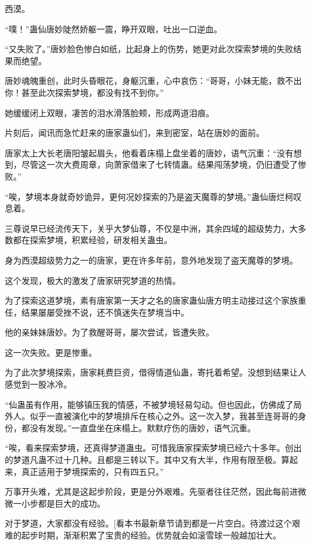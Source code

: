 
\begin{this_body}

西漠。

“噗！”蛊仙唐妙陡然娇躯一震，睁开双眼，吐出一口逆血。

“又失败了。”唐妙脸色惨白如纸，比起身上的伤势，她更对此次探索梦境的失败结果而绝望。

唐妙魂魄重创，此时头昏眼花，身躯沉重，心中哀伤：“哥哥，小妹无能，救不出你！甚至此次探索梦境，都没有找不到你。”

她缓缓闭上双眼，凄苦的泪水滑落脸颊，形成两道泪痕。

片刻后，闻讯而急忙赶来的唐家蛊仙们，来到密室，站在唐妙的面前。

唐家太上大长老唐阳皱起眉头，他看着床榻上盘坐着的唐妙，语气沉重：“没有想到，尽管这一次大费周章，向萧家借来了七转情蛊。结果闯荡梦境，仍旧遭受了惨败。”

“唉，梦境本身就奇妙诡异，更何况妙探索的乃是盗天魔尊的梦境。”蛊仙唐烂柯叹息着。

三尊说早已经流传天下，关乎大梦仙尊，不仅是中洲，其余四域的超级势力，大多数都在探索梦境，积累经验，研发相关蛊虫。

身为西漠超级势力之一的唐家，更在许多年前，意外地发现了盗天魔尊的梦境。

这个发现，极大的激发了唐家研究梦道的热情。

为了探索这道梦境，素有唐家第一天才之名的唐家蛊仙唐方明主动接过这个家族重任，结果屡屡受挫不说，还不慎迷失在梦境当中。

他的亲妹妹唐妙。为了救醒哥哥，屡次尝试，皆遭失败。

这一次失败。更是惨重。

为了此次梦境探索，唐家耗费巨资，借得情道仙蛊，寄托着希望。没想到结果让人感觉到一股冰冷。

“仙蛊虽有作用，能够镇压我的情感，不被梦境轻易勾动。但也因此，仿佛成了局外人。似乎一直被演化中的梦境排斥在核心之外。这一次入梦，我甚至连哥哥的身份，都没有发现。”一直盘坐在床榻上。默默疗伤的唐妙，语气沉重。

“唉，看来探索梦境，还真得梦道蛊虫。可惜我唐家探索梦境已经六十多年。创出的梦道凡蛊不过十几种。且都是三转以下。其中又有大半，作用有限至极。算起来，真正适用于梦境探索的，只有四五只。”

万事开头难，尤其是这起步阶段，更是分外艰难。先驱者往往茫然，因此每前进微微一小步都是巨大的成功。

对于梦道，大家都没有经验。[看本书最新章节请到都是一片空白。待渡过这个艰难的起步时期，渐渐积累了宝贵的经验。优势就会如滚雪球一般越加壮大。


\end{this_body}
